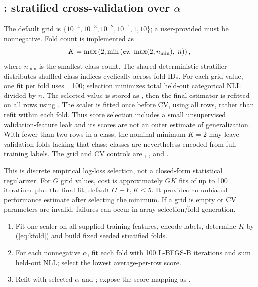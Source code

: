 \documentclass[conference]{IEEEtran}
\begin{document}
\subsection{: stratified cross-validation over \(\alpha\)}
The default grid is \(\{10^{-4},10^{-3},10^{-2},10^{-1},1,10\}\); a user-provided  must be nonnegative. Fold count is implemented as
\begin{equation}
K=\max\left(2,\min\left(\texttt{\small cv},\;\max(2,n_{\min}),\;n\right)\right),
\label{eq:kfold}
\end{equation}
where \(n_{\min}\) is the smallest class count. The shared deterministic stratifier distributes shuffled class indices cyclically across fold IDs. For each grid value, one fit per fold uses =100; selection minimizes total held-out categorical NLL divided by \(n\). The selected value is stored as , then the final estimator is refitted on all rows using . The scaler is fitted once before CV, using all rows, rather than refit within each fold. Thus score selection includes a small unsupervised validation-feature leak and its scores are not an outer estimate of generalization. With fewer than two rows in a class, the nominal minimum \(K=2\) may leave validation folds lacking that class; classes are nevertheless encoded from full training labels. The grid and CV controls are , , and .

This is discrete empirical log-loss selection, not a closed-form statistical regularizer. For \(G\) grid values, cost is approximately \(G K\) fits of up to 100 iterations plus the final fit; default \(G=6,K\leq5\). It provides no unbiased performance estimate after selecting the minimum. If a grid is empty or CV parameters are invalid, failures can occur in array selection/fold generation.
\begin{enumerate}
\item Fit one scaler on all supplied training features, encode labels, determine \(K\) by (\ref{eq:kfold}) and build fixed seeded stratified folds.
\item For each nonnegative \(\alpha\), fit each fold with 100 L-BFGS-B iterations and sum held-out NLL; select the lowest average-per-row score.
\item Refit with selected \(\alpha\) and ; expose the score mapping as .
\end{enumerate}
\end{document}
